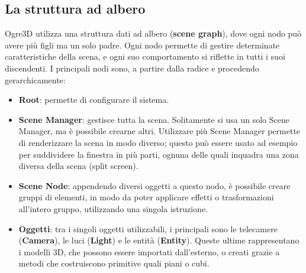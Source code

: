 \subsection{La struttura ad albero}
Ogre3D utilizza una struttura dati ad albero (\textbf{scene graph}), dove ogni nodo può avere più figli ma un solo padre. Ogni nodo permette di gestire determinate caratteristiche della scena, e ogni suo comportamento si riflette in tutti i suoi discendenti. I principali nodi sono, a partire dalla radice e procedendo gerarchicamente:
\begin{itemize}
\item \textbf{Root}: permette di configurare il sistema.
\item \textbf{Scene Manager}: gestisce tutta la scena. Solitamente si usa un solo Scene Manager, ma è possibile crearne altri. Utilizzare più Scene Manager permette di renderizzare la scena in modo diverso; questo può essere usato ad esempio per suddividere la finestra in più parti, ognuna delle quali inquadra una zona diversa della scena (split screen).
\item \textbf{Scene Node}: appendendo diversi oggetti a questo nodo, è possibile creare gruppi di elementi, in modo da poter applicare effetti o trasformazioni all'intero gruppo, utilizzando una singola istruzione.
\item \textbf{Oggetti}: tra i singoli oggetti utilizzabili, i principali sono le telecamere (\textbf{Camera}), le luci (\textbf{Light}) e le entità (\textbf{Entity}). Queste ultime rappresentano i modelli 3D, che possono essere importati dall'esterno, o creati grazie a metodi che costruiscono primitive quali piani o cubi. 
\end{itemize}
%
%

